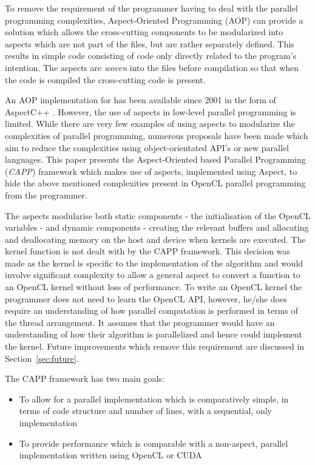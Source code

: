\documentclass{sig-alternate-05-2015}
\begin{document}
To remove the requirement of the programmer having to deal with the parallel
programming complexities, 
Aspect-Oriented Programming  (AOP) \cite{gregor:aop} can provide a solution which 
allows the cross-cutting components to be modularized into aspects which are not
part of the \CPP files, but are rather separately defined. This
results in simple \CPP code consisting of code only directly related to 
the program's intention. The aspects are \textit{woven} into the \CPP files before 
compilation so that when the code is compiled the cross-cutting code is present.

An AOP implementation for \CPP has been available  since 2001 in the form of AspectC++ 
\cite{gal:acppprop, olaf:app}. However, the use of aspects in low-level
parallel programming is limited. While there are very few examples of using
aspects to modularize the complexities of parallel programming, numerous proposals 
have been made which aim to reduce the complexities using object-orientated
API's or new parallel languages.  This paper presents the \CPP Aspect-Oriented based Parallel
Programming (\textit{CAPP}) framework which makes use of aspects, implemented using Aspect\CPP, to 
hide the above mentioned complexities present in OpenCL parallel programming 
from the programmer. 

The aspects modularise both static components - the initialisation of the
OpenCL variables - and dynamic components - creating the relevant buffers
and allocating and deallocating memory on the host and device when kernels are
executed. The kernel function is not dealt with by the  CAPP framework. This
decision was made as the kernel is specific to the implementation of the
algorithm and would involve significant complexity to allow a general aspect to
convert a \CPP function to an OpenCL kernel without loss of performance. To write 
an OpenCL kernel the programmer does not need to learn the OpenCL API, however,
he/she does require an understanding of how parallel computation is performed in terms of
the thread arrangement. It assumes that the programmer would have an
understanding of how their algorithm is parallelized and hence could implement
the kernel. Future improvements which remove this requirement are discussed in
Section~\ref{sec:future}.

The  CAPP framework has two main goals:
\begin{itemize}
	\item{To allow for a parallel implementation 
			which is comparatively simple, in terms of code structure and number
			of lines, with a sequential, \CPP only implementation
		}
	\item{To provide performance which is comparable with a non-aspect, parallel
			implementation written using OpenCL or CUDA
		}
\end{itemize}
\end{document}
